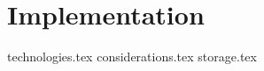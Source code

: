 \documentclass{article}
\begin{document}
\section{Implementation}
{technologies.tex}
{considerations.tex}
{storage.tex}
\end{document}
